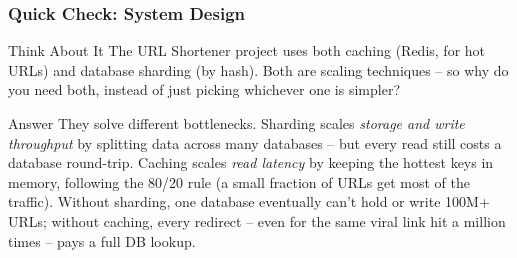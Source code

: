 \begin{frame}[fragile]\frametitle{Quick Check: System Design}
\begin{block}{Think About It}
The URL Shortener project uses both caching (Redis, for hot URLs) and database sharding (by hash). Both are scaling techniques -- so why do you need both, instead of just picking whichever one is simpler?
\end{block}
\pause
\begin{block}{Answer}
They solve different bottlenecks. Sharding scales \emph{storage and write throughput} by splitting data across many databases -- but every read still costs a database round-trip. Caching scales \emph{read latency} by keeping the hottest keys in memory, following the 80/20 rule (a small fraction of URLs get most of the traffic). Without sharding, one database eventually can't hold or write 100M+ URLs; without caching, every redirect -- even for the same viral link hit a million times -- pays a full DB lookup.
\end{block}
\end{frame}